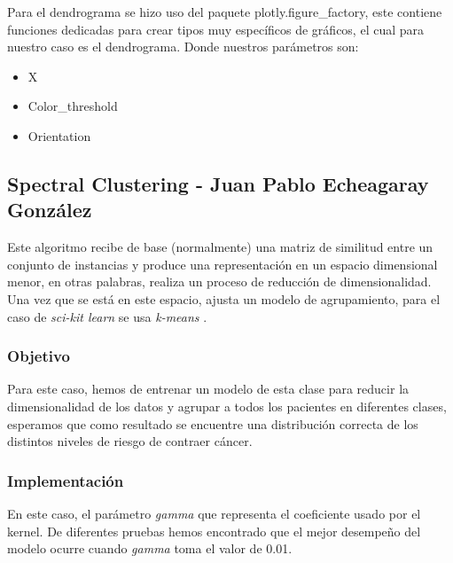 \documentclass[journal]{IEEEtran}
\begin{document}
            Para el dendrograma se hizo uso del paquete plotly.figure\_factory, este contiene funciones dedicadas para crear tipos muy específicos de gráficos, el cual para nuestro caso es el dendrograma. Donde nuestros parámetros son:
            
            \begin{itemize}
            \item X
            \item Color\_threshold
            \item Orientation
            \end{itemize}

        
        \subsection{Spectral Clustering - Juan Pablo Echeagaray González} \label{spectral}
        
            Este algoritmo recibe de base (normalmente) una matriz de similitud entre un conjunto de instancias y produce una representación en un espacio dimensional menor, en otras palabras, realiza un proceso de reducción de dimensionalidad. Una vez que se está en este espacio, ajusta un modelo de agrupamiento, para el caso de \emph{sci-kit learn} se usa \emph{k-means} \cite{geron2019hands}.
            
            \subsubsection{Objetivo}
                
                Para este caso, hemos de entrenar un modelo de esta clase para reducir la dimensionalidad de los datos y agrupar a todos los pacientes en diferentes clases, esperamos que como resultado se encuentre una distribución correcta de los distintos niveles de riesgo de contraer cáncer.
                
            \vspace*{2mm}    
            \subsubsection{Implementación}
            
                En este caso, el parámetro \emph{gamma} que representa el coeficiente usado por el kernel. De diferentes pruebas hemos encontrado que el mejor desempeño del modelo ocurre cuando \emph{gamma} toma el valor de 0.01.
                
\end{document}
